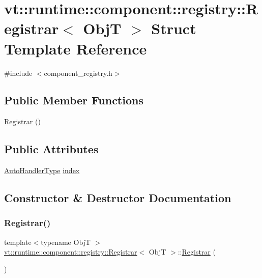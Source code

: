 \hypertarget{structvt_1_1runtime_1_1component_1_1registry_1_1_registrar}{}\section{vt\+:\+:runtime\+:\+:component\+:\+:registry\+:\+:Registrar$<$ ObjT $>$ Struct Template Reference}
\label{structvt_1_1runtime_1_1component_1_1registry_1_1_registrar}


{\ttfamily \#include $<$component\+\_\+registry.\+h$>$}

\subsection*{Public Member Functions}
\begin{DoxyCompactItemize}
\item 
\hyperlink{structvt_1_1runtime_1_1component_1_1registry_1_1_registrar_a6cc2c9515c686dab9ac32c091854ef12}{Registrar} ()
\end{DoxyCompactItemize}
\subsection*{Public Attributes}
\begin{DoxyCompactItemize}
\item 
\hyperlink{namespacevt_1_1runtime_1_1component_1_1registry_a9b86518797c7bb91babf0ca8ee7d06e6}{Auto\+Handler\+Type} \hyperlink{structvt_1_1runtime_1_1component_1_1registry_1_1_registrar_a7dfbeea6d73d4baed5c94abfdd172cc6}{index}
\end{DoxyCompactItemize}


\subsection{Constructor \& Destructor Documentation}
\mbox{\label{structvt_1_1runtime_1_1component_1_1registry_1_1_registrar_a6cc2c9515c686dab9ac32c091854ef12}} 
\subsubsection{\texorpdfstring{Registrar()}{Registrar()}}
{\footnotesize\ttfamily template$<$typename ObjT $>$ \\
\hyperlink{structvt_1_1runtime_1_1component_1_1registry_1_1_registrar}{vt\+::runtime\+::component\+::registry\+::\+Registrar}$<$ ObjT $>$\+::\hyperlink{structvt_1_1runtime_1_1component_1_1registry_1_1_registrar}{Registrar} (\begin{DoxyParamCaption}{ }\end{DoxyParamCaption})\hspace{0.3cm}{\ttfamily [inline]}}



